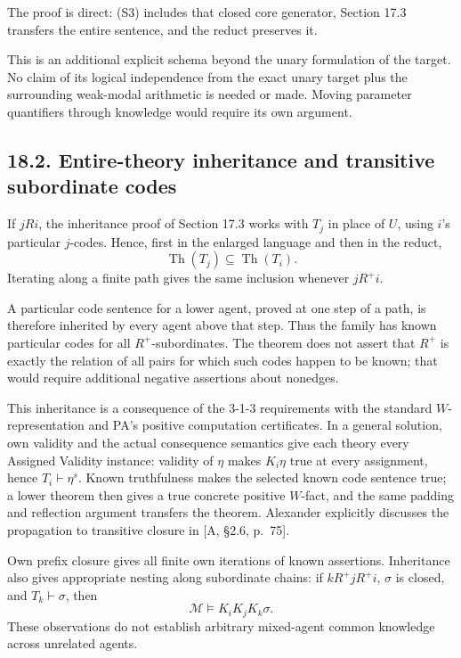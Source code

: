 \documentclass[
  11pt,
  letterpaper,
]{article}
\begin{document}
The proof is direct: (S3) includes that closed core generator, Section
17.3 transfers the entire sentence, and the reduct preserves it.

This is an additional explicit schema beyond the unary formulation of
the target. No claim of its logical independence from the exact unary
target plus the surrounding weak-modal arithmetic is needed or made.
Moving parameter quantifiers through knowledge would require its own
argument.

\subsection{18.2. Entire-theory inheritance and transitive subordinate
codes}\label{entire-theory-inheritance-and-transitive-subordinate-codes}

If \(jRi\), the inheritance proof of Section 17.3 works with \(T_j\) in
place of \(U\), using \(i\)'s particular \(j\)-codes. Hence, first in
the enlarged language and then in the reduct, \[
\operatorname{Th}(T_j)\subseteq\operatorname{Th}(T_i).
\tag{P2}
\] Iterating along a finite path gives the same inclusion whenever
\(jR^+i\).

A particular code sentence for a lower agent, proved at one step of a
path, is therefore inherited by every agent above that step. Thus the
family has known particular codes for all \(R^+\)-subordinates. The
theorem does not assert that \(R^+\) is exactly the relation of all
pairs for which such codes happen to be known; that would require
additional negative assertions about nonedges.

This inheritance is a consequence of the 3-1-3 requirements with the
standard \(W\)-representation and PA's positive computation
certificates. In a general solution, own validity and the actual
consequence semantics give each theory every Assigned Validity instance:
validity of \(\eta\) makes \(K_i\eta\) true at every assignment, hence
\(T_i\vdash\eta^s\). Known truthfulness makes the selected known code
sentence true; a lower theorem then gives a true concrete positive
\(W\)-fact, and the same padding and reflection argument transfers the
theorem. Alexander explicitly discusses the propagation to transitive
closure in {[}A, §2.6, p.~75{]}.

Own prefix closure gives all finite own iterations of known assertions.
Inheritance also gives appropriate nesting along subordinate chains: if
\(kR^+jR^+i\), \(\sigma\) is closed, and \(T_k\vdash\sigma\), then \[
\mathcal M\models K_iK_jK_k\sigma.
\] These observations do not establish arbitrary mixed-agent common
knowledge across unrelated agents.
\end{document}
